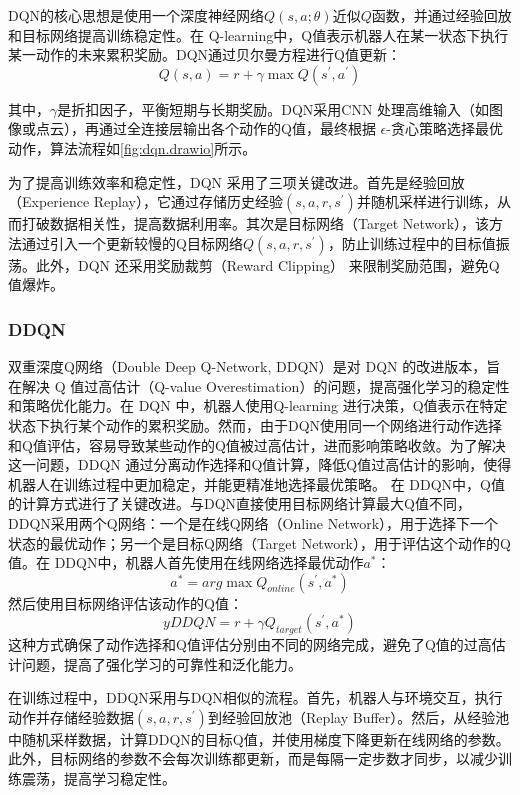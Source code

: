 DQN的核心思想是使用一个深度神经网络$Q(s,a;\theta)$近似$Q$函数，并通过经验回放和目标网络提高训练稳定性。在 Q-learning中，Q值表示机器人在某一状态下执行某一动作的未来累积奖励。DQN通过贝尔曼方程进行Q值更新：
\begin{equation}
	\label{equ:DQN}
	Q(s,a) = r + \gamma\max Q(s^{\prime},a^{\prime})
\end{equation}

其中，$\gamma$是折扣因子，平衡短期与长期奖励。DQN采用CNN 处理高维输入（如图像或点云），再通过全连接层输出各个动作的Q值，最终根据 $\epsilon$-贪心策略选择最优动作，算法流程如\cref{fig:dqn.drawio}所示。

为了提高训练效率和稳定性，DQN 采用了三项关键改进。首先是经验回放（Experience Replay），它通过存储历史经验$(s,a,r,s^{\prime})$并随机采样进行训练，从而打破数据相关性，提高数据利用率。其次是目标网络（Target Network），该方法通过引入一个更新较慢的Q目标网络$Q(s,a,r,s^{\prime})$，防止训练过程中的目标值振荡。此外，DQN 还采用奖励裁剪（Reward Clipping） 来限制奖励范围，避免Q值爆炸。

\subsubsection{DDQN}
双重深度Q网络\cite{van2016deep}（Double Deep Q-Network, DDQN）是对 DQN 的改进版本，旨在解决 Q 值过高估计（Q-value Overestimation）的问题，提高强化学习的稳定性和策略优化能力。在 DQN 中，机器人使用Q-learning 进行决策，Q值表示在特定状态下执行某个动作的累积奖励。然而，由于DQN使用同一个网络进行动作选择和Q值评估，容易导致某些动作的Q值被过高估计，进而影响策略收敛。为了解决这一问题，DDQN 通过分离动作选择和Q值计算，降低Q值过高估计的影响，使得机器人在训练过程中更加稳定，并能更精准地选择最优策略。
在 DDQN中，Q值的计算方式进行了关键改进。与DQN直接使用目标网络计算最大Q值不同，DDQN采用两个Q网络：一个是在线Q网络（Online Network），用于选择下一个状态的最优动作；另一个是目标Q网络（Target Network），用于评估这个动作的Q值。在 DDQN中，机器人首先使用在线网络选择最优动作$a^{*}$：
\begin{equation}
	\label{equ:DDQN1}
	a^{*} = arg\max Q_{online}(s^{\prime},a^{*})
\end{equation}
然后使用目标网络评估该动作的Q值：
\begin{equation}
	\label{equ:DDQN2}
	yDDQN = r + \gamma Q_{target}(s^{\prime},a^{*})
\end{equation}
这种方式确保了动作选择和Q值评估分别由不同的网络完成，避免了Q值的过高估计问题，提高了强化学习的可靠性和泛化能力。

在训练过程中，DDQN采用与DQN相似的流程。首先，机器人与环境交互，执行动作并存储经验数据$(s,a,r,s^{\prime})$到经验回放池（Replay Buffer）。然后，从经验池中随机采样数据，计算DDQN的目标Q值，并使用梯度下降更新在线网络的参数。此外，目标网络的参数不会每次训练都更新，而是每隔一定步数才同步，以减少训练震荡，提高学习稳定性。

